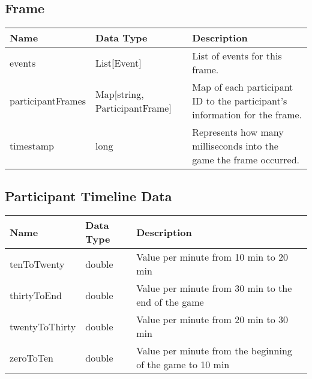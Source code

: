 \FloatBarrier
\subsection{Frame}
\begin{table}[!h]
\footnotesize
\centering
\begin{tabular}{llp{5cm}}
\textbf{Name}     & \textbf{Data Type}                & \textbf{Description}                                                       \\ \hline
events            & List{[}Event{]}                   & List of events for this frame.                                             \\ \hline
participantFrames & Map{[}string, ParticipantFrame{]} & Map of each participant ID to the participant's information for the frame. \\ \hline
timestamp         & long                              & Represents how many milliseconds into the game the frame occurred.         \\ \hline
\end{tabular}
\end{table}


\FloatBarrier
\subsection{Participant Timeline Data}
\begin{table}[!h]
\footnotesize
\centering
\begin{tabular}{llp{5cm}}
Name           & Data Type & Description                                               \\ \hline
tenToTwenty    & double    & Value per minute from 10 min to 20 min                    \\ \hline
thirtyToEnd    & double    & Value per minute from 30 min to the end of the game       \\ \hline
twentyToThirty & double    & Value per minute from 20 min to 30 min                    \\ \hline
zeroToTen      & double    & Value per minute from the beginning of the game to 10 min \\ \hline
\end{tabular}
\end{table}


\FloatBarrier
